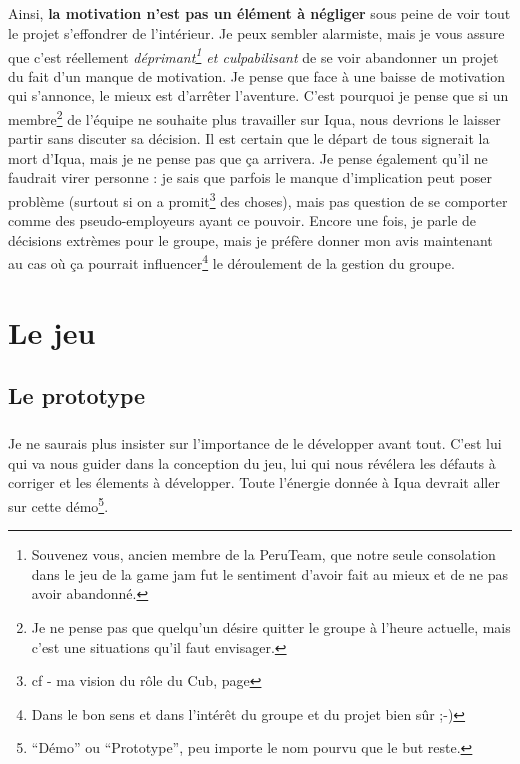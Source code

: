 \documentclass{report}
\begin{document}
\paragraph{}
Ainsi, \textbf{la motivation n'est pas un élément à négliger} sous peine de voir tout le projet s'effondrer de l'intérieur. Je peux sembler alarmiste, mais je vous assure que c'est réellement \textit{déprimant\footnote{Souvenez vous, ancien membre de la PeruTeam, que notre seule consolation dans le jeu de la game jam fut le sentiment d'avoir fait au mieux et de ne pas avoir abandonné.} et culpabilisant} de se voir abandonner un projet du fait d'un manque de motivation. Je pense que face à une baisse de motivation qui s'annonce, le mieux est d'arrêter l'aventure. C'est pourquoi je pense que si un membre\footnote{Je ne pense pas que quelqu'un désire quitter le groupe à l'heure actuelle, mais c'est une situations qu'il faut envisager.} de l'équipe ne souhaite plus travailler sur Iqua, nous devrions le laisser partir sans discuter sa décision. Il est certain que le départ de tous signerait la mort d'Iqua, mais je ne pense pas que ça arrivera. Je pense également qu'il ne faudrait virer personne : je sais que parfois le manque d'implication peut poser problème (surtout si on a promit\footnote{cf - ma vision du rôle du Cub, page \pageref{independanceCub} } des choses), mais pas question de se comporter comme des pseudo-employeurs ayant ce pouvoir. Encore une fois, je parle de décisions extrèmes pour le groupe, mais je préfère donner mon avis maintenant au cas où ça pourrait influencer\footnote{Dans le bon sens et dans l'intérêt du groupe et du projet bien sûr ;-) } le déroulement de la gestion du groupe.

\chapter{Le jeu}

\section{Le prototype}
\paragraph{}
Je ne saurais plus insister sur l'importance de le développer avant tout. C'est lui qui va nous guider dans la conception du jeu, lui qui nous révélera les défauts à corriger et les élements à développer. Toute l'énergie donnée à Iqua devrait aller sur cette démo\footnote{``Démo'' ou ``Prototype'', peu importe le nom pourvu que le but reste.}.
\end{document}
